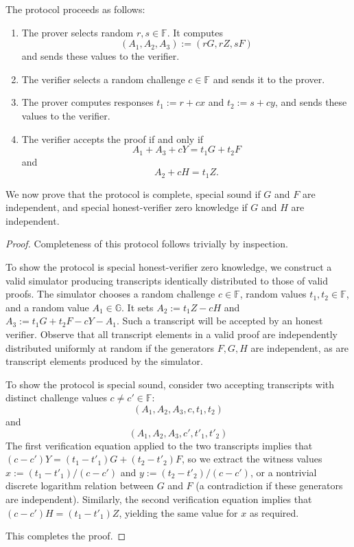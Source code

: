 \documentclass{llncs}
\newcommand{\G}{\mathbb{G}}
\newcommand{\F}{\mathbb{F}}
\begin{document}
The protocol proceeds as follows:
\begin{enumerate}
    \item The prover selects random $r,s \in \F$.
    It computes $$(A_1, A_2, A_3) := (rG, rZ, sF)$$ and sends these values to the verifier.
    \item The verifier selects a random challenge $c \in \F$ and sends it to the prover.
    \item The prover computes responses $t_1 := r + cx$ and $t_2 := s + cy$, and sends these values to the verifier.
    \item The verifier accepts the proof if and only if $$A_1 + A_3 + cY = t_1 G + t_2 F$$ and $$A_2 + cH = t_1 Z.$$
\end{enumerate}

We now prove that the protocol is complete, special sound if $G$ and $F$ are independent, and special honest-verifier zero knowledge if $G$ and $H$ are independent.

\begin{proof}
Completeness of this protocol follows trivially by inspection.

To show the protocol is special honest-verifier zero knowledge, we construct a valid simulator producing transcripts identically distributed to those of valid proofs.
The simulator chooses a random challenge $c \in \F$, random values $t_1, t_2 \in \F$, and a random value $A_1 \in \G$.
It sets $A_2 := t_1 Z - cH$ and $A_3 := t_1 G + t_2 F - cY - A_1$.
Such a transcript will be accepted by an honest verifier.
Observe that all transcript elements in a valid proof are independently distributed uniformly at random if the generators $F,G,H$ are independent, as are transcript elements produced by the simulator.

To show the protocol is special sound, consider two accepting transcripts with distinct challenge values $c \neq c' \in \F$:
$$(A_1, A_2, A_3, c, t_1, t_2)$$
and
$$(A_1, A_2, A_3, c', t'_1, t'_2)$$
The first verification equation applied to the two transcripts implies that $(c - c')Y = (t_1 - t'_1)G + (t_2 - t'_2)F$, so we extract the witness values $x := (t_1 - t'_1)/(c - c')$ and $y := (t_2 - t'_2)/(c - c')$, or a nontrivial discrete logarithm relation between $G$ and $F$ (a contradiction if these generators are independent).
Similarly, the second verification equation implies that $(c - c')H = (t_1 - t'_1)Z$, yielding the same value for $x$ as required.

This completes the proof.
\end{proof}
\end{document}

